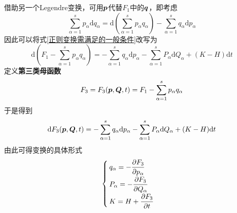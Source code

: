 借助另一个Legendre变换，可用$\boldsymbol{p}$代替$F_1$中的$\boldsymbol{q}$，即考虑
\begin{equation*}
	\sum_{\alpha=1}^s p_\alpha \mathrm{d} q_\alpha = \mathrm{d} \left(\sum_{\alpha=1}^s p_\alpha q_\alpha\right) - \sum_{\alpha=1}^s q_\alpha \mathrm{d} p_\alpha
\end{equation*}
因此可以将式\eqref{正则变换需满足的一般条件}改写为
\begin{equation*}
	\mathrm{d} \left(F_1 - \sum_{\alpha=1}^s p_\alpha q_\alpha\right) = -\sum_{\alpha=1}^s q_\alpha \mathrm{d} p_\alpha - \sum_{\alpha=1}^s P_\alpha \mathrm{d} Q_\alpha + (K-H) \mathrm{d} t
\end{equation*}
定义{\bf 第三类母函数}
\begin{equation}
	F_3 = F_3(\boldsymbol{p},\boldsymbol{Q},t) = F_1 - \sum_{\alpha=1}^s p_\alpha q_\alpha
	\label{第三类母函数}
\end{equation}
于是得到
\begin{equation}
	\mathrm{d} F_3(\boldsymbol{p},\boldsymbol{Q},t) = -\sum_{\alpha=1}^s q_\alpha \mathrm{d} p_\alpha - \sum_{\alpha=1}^s P_\alpha \mathrm{d} Q_\alpha + (K-H) \mathrm{d} t
	\label{第三类母函数下的正则变换}
\end{equation}
由此可得变换的具体形式
\begin{equation}
	\begin{cases}
		\displaystyle q_\alpha = -\frac{\partial F_3}{\partial p_\alpha} \\[1.5ex]
		\displaystyle P_\alpha = -\frac{\partial F_3}{\partial Q_\alpha} \\[1.5ex]
		\displaystyle K = H + \frac{\partial F_3}{\partial t}
	\end{cases}
\end{equation}


